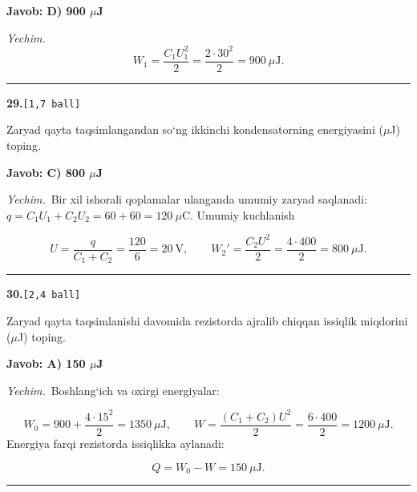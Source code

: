 \documentclass[11pt,a4paper]{article}
\newcommand{\ball}[1]{\hfill\texttt{[#1 ball]}}
\begin{document}
\noindent\colorbox{gray!12}{\parbox{\dimexpr\linewidth-2\fboxsep}{\textbf{Javob: D) 900 $\mu$J}}}\par\smallskip
\noindent\textit{Yechim.}\ \[W_1=\frac{C_1U_1^2}{2}=\frac{2\cdot30^2}{2}=900\ \mu\text{J}.\]\par\medskip\hrule\medskip
\noindent\textbf{29.}\ball{1,7}\par\nopagebreak\noindent Zaryad qayta taqsimlangandan so‘ng ikkinchi kondensatorning energiyasini ($\mu$J) toping.\par
\noindent\colorbox{gray!12}{\parbox{\dimexpr\linewidth-2\fboxsep}{\textbf{Javob: C) 800 $\mu$J}}}\par\smallskip
\noindent\textit{Yechim.}\ Bir xil ishorali qoplamalar ulanganda umumiy zaryad saqlanadi: $q=C_1U_1+C_2U_2=60+60=120\ \mu$C. Umumiy kuchlanish\par
\[U=\frac{q}{C_1+C_2}=\frac{120}{6}=20\ \text{V},\qquad W_2'=\frac{C_2U^2}{2}=\frac{4\cdot400}{2}=800\ \mu\text{J}.\]\par\medskip\hrule\medskip
\noindent\textbf{30.}\ball{2,4}\par\nopagebreak\noindent Zaryad qayta taqsimlanishi davomida rezistorda ajralib chiqqan issiqlik miqdorini ($\mu$J) toping.\par
\noindent\colorbox{gray!12}{\parbox{\dimexpr\linewidth-2\fboxsep}{\textbf{Javob: A) 150 $\mu$J}}}\par\smallskip
\noindent\textit{Yechim.}\ Boshlang‘ich va oxirgi energiyalar:\par
\[W_0=900+\frac{4\cdot15^2}{2}=1350\ \mu\text{J},\qquad W=\frac{(C_1+C_2)U^2}{2}=\frac{6\cdot400}{2}=1200\ \mu\text{J}.\]
Energiya farqi rezistorda issiqlikka aylanadi:\par
\[Q=W_0-W=150\ \mu\text{J}.\]\par\medskip\hrule\medskip
\end{document}
